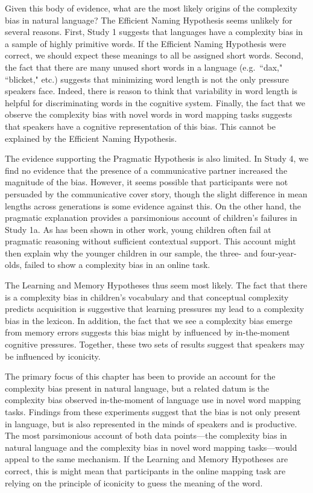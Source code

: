 Given this body of evidence, what are the most likely origins of the complexity bias in natural language? The Efficient Naming Hypothesis seems unlikely for several reasons. First, Study 1 suggests that languages have a complexity bias in a  sample of highly primitive words. If the Efficient Naming Hypothesis were correct, we should expect these meanings to all be assigned short words. Second, the fact that there are many unused short words in a language (e.g.\ ``dax," ``blicket," etc.) suggests that minimizing word length is not the only pressure speakers face. Indeed, there is reason to think that variability in word length is helpful for discriminating words in the cognitive system. Finally, the fact that we observe the complexity bias with novel words in word mapping tasks suggests that speakers have a cognitive representation of this bias. This cannot be explained by the Efficient Naming Hypothesis.

The evidence supporting the Pragmatic Hypothesis is also limited. In Study 4, we find no evidence that the presence of a communicative partner increased the magnitude of the bias. However, it seems possible that participants were not persuaded by the communicative cover story, though the slight difference in mean lengths across generations is some evidence against this. On the other hand, the pragmatic explanation provides a parsimonious account of children's failures in Study 1a. As has been shown in other work, young children often fail at pragmatic reasoning without sufficient contextual support. This account might then explain why the younger children in our sample, the three- and four-year-olds, failed to show a complexity bias in an online task. 

The Learning and Memory Hypotheses thus seem most likely. The fact that there is a complexity bias in children's vocabulary and that conceptual complexity predicts acquisition is suggestive that learning pressures my lead to a complexity bias in the lexicon. In addition, the fact that we see a complexity bias emerge from memory errors suggests this bias might by influenced by in-the-moment cognitive pressures. Together, these two sets of results suggest that speakers may be influenced by iconicity.

The primary focus of this chapter has been to provide an account for the complexity bias present in natural language, but a related datum is the complexity bias observed in-the-moment of language use in novel word mapping tasks. Findings from these experiments suggest that the bias is not only present in language, but is also represented in the minds of speakers and is productive. The most parsimonious account of both data points---the complexity bias in natural language and the complexity bias in novel word mapping tasks---would appeal to the same mechanism. If the Learning and Memory Hypotheses are correct, this is might mean that participants in the online mapping task are relying on the principle of iconicity to guess the meaning of the word. 

